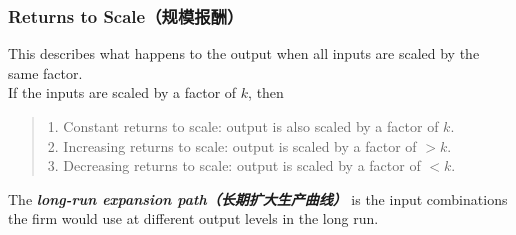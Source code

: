 \subsubsection{Returns to Scale（规模报酬）}
This describes what happens to the output when all inputs are scaled by the same factor. \\
If the inputs are scaled by a factor of $k$, then
\begin{quote}
    1. Constant returns to scale: output is also scaled by a factor of $k$. \\
    2. Increasing returns to scale: output is scaled by a factor of $> k$. \\
    3. Decreasing returns to scale: output is scaled by a factor of $< k$.
\end{quote}
The \textbf{\textit{long-run expansion path（长期扩大生产曲线）}} is the input combinations the firm would use at different output levels in the long run.

\newpage